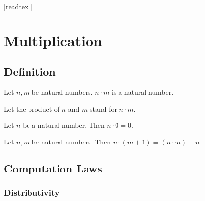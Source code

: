 \documentclass[10pt]{article}
\begin{document}
  \begin{imports}
    \begin{forthel}
      [readtex ]
    \end{forthel}
  \end{imports}


  \section*{Multiplication}

  \subsection*{Definition}

  \begin{forthel}
    \begin{signature}
      Let $n, m$ be natural numbers.
      $n \cdot m$ is a natural number.
    \end{signature}

    Let the product of $n$ and $m$ stand for $n \cdot m$.
  \end{forthel}

  \begin{forthel}
    \begin{axiom}
      Let $n$ be a natural number.
      Then $n \cdot 0 = 0$.
    \end{axiom}
  \end{forthel}

  \begin{forthel}
    \begin{axiom}
      Let $n, m$ be natural numbers.
      Then $n \cdot (m + 1) = (n \cdot m) + n$.
    \end{axiom}
  \end{forthel}


  \subsection*{Computation Laws}

  \subsubsection*{Distributivity}
\end{document}
